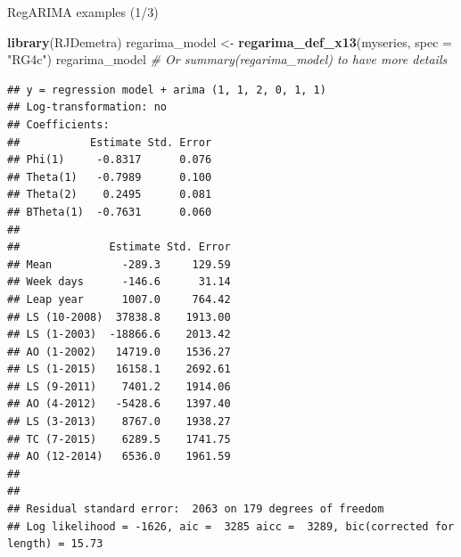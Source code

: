 \documentclass[10pt,xcolor=table,color={dvipsnames,usenames},ignorenonframetext,usepdftitle=false,french]{beamer}
\newenvironment{Shaded}{\begin{snugshade}}{\end{snugshade}}
\newcommand{\KeywordTok}[1]{\textcolor[rgb]{0.13,0.29,0.53}{\textbf{#1}}}
\newcommand{\DataTypeTok}[1]{\textcolor[rgb]{0.13,0.29,0.53}{#1}}
\newcommand{\StringTok}[1]{\textcolor[rgb]{0.31,0.60,0.02}{#1}}
\newcommand{\CommentTok}[1]{\textcolor[rgb]{0.56,0.35,0.01}{\textit{#1}}}
\newcommand{\NormalTok}[1]{#1}
\begin{document}
\begin{frame}[fragile]{RegARIMA examples (1/3)}

\footnotesize

\begin{Shaded}
\begin{Highlighting}[]
\KeywordTok{library}\NormalTok{(RJDemetra)}
\NormalTok{regarima_model <-}\StringTok{ }\KeywordTok{regarima_def_x13}\NormalTok{(myseries, }\DataTypeTok{spec =} \StringTok{"RG4c"}\NormalTok{)}
\NormalTok{regarima_model }\CommentTok{# Or summary(regarima_model) to have more details}
\end{Highlighting}
\end{Shaded}

\begin{verbatim}
## y = regression model + arima (1, 1, 2, 0, 1, 1)
## Log-transformation: no
## Coefficients:
##           Estimate Std. Error
## Phi(1)     -0.8317      0.076
## Theta(1)   -0.7989      0.100
## Theta(2)    0.2495      0.081
## BTheta(1)  -0.7631      0.060
## 
##              Estimate Std. Error
## Mean           -289.3     129.59
## Week days      -146.6      31.14
## Leap year      1007.0     764.42
## LS (10-2008)  37838.8    1913.00
## LS (1-2003)  -18866.6    2013.42
## AO (1-2002)   14719.0    1536.27
## LS (1-2015)   16158.1    2692.61
## LS (9-2011)    7401.2    1914.06
## AO (4-2012)   -5428.6    1397.40
## LS (3-2013)    8767.0    1938.27
## TC (7-2015)    6289.5    1741.75
## AO (12-2014)   6536.0    1961.59
## 
## 
## Residual standard error:  2063 on 179 degrees of freedom
## Log likelihood = -1626, aic =  3285 aicc =  3289, bic(corrected for length) = 15.73
\end{verbatim}

\end{frame}
\end{document}
